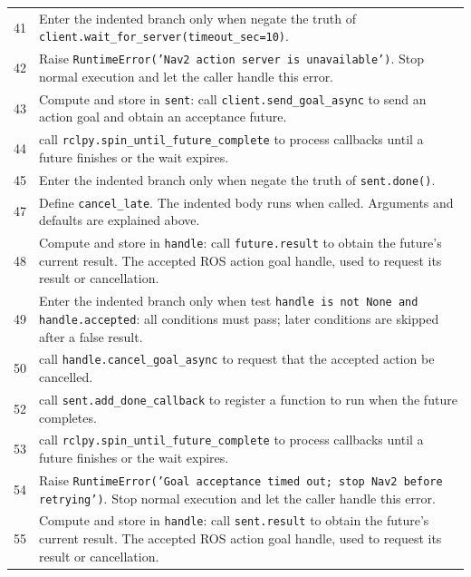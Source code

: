 \documentclass[11pt,a4paper]{book}
\begin{document}
\begin{longtable}{r p{}}
41 & Enter the indented branch only when negate the truth of \texttt{client.wait\_for\_server(timeout\_sec=10)}. \\

42 & Raise \texttt{RuntimeError('Nav2 action server is unavailable')}. Stop normal execution and let the caller handle this error. \\

43 & Compute and store in \texttt{sent}: call \texttt{client.send\_goal\_async} to send an action goal and obtain an acceptance future.  \\

44 & call \texttt{rclpy.spin\_until\_future\_complete} to process callbacks until a future finishes or the wait expires. \\

45 & Enter the indented branch only when negate the truth of \texttt{sent.done()}. \\

47 & Define \texttt{cancel\_late}. The indented body runs when called. Arguments and defaults are explained above. \\

48 & Compute and store in \texttt{handle}: call \texttt{future.result} to obtain the future's current result. The accepted ROS action goal handle, used to request its result or cancellation. \\

49 & Enter the indented branch only when test \texttt{handle is not None and handle.accepted}: all conditions must pass; later conditions are skipped after a false result. \\

50 & call \texttt{handle.cancel\_goal\_async} to request that the accepted action be cancelled. \\

52 & call \texttt{sent.add\_done\_callback} to register a function to run when the future completes. \\

53 & call \texttt{rclpy.spin\_until\_future\_complete} to process callbacks until a future finishes or the wait expires. \\

54 & Raise \texttt{RuntimeError('Goal acceptance timed out; stop Nav2 before retrying')}. Stop normal execution and let the caller handle this error. \\

55 & Compute and store in \texttt{handle}: call \texttt{sent.result} to obtain the future's current result. The accepted ROS action goal handle, used to request its result or cancellation. \\


\end{longtable}
\end{document}
